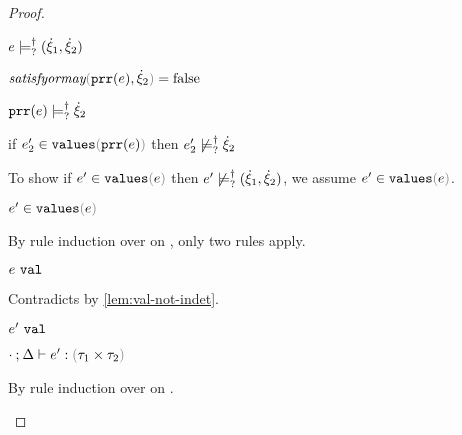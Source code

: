 \begin{proof}
\begin{byCases}
\begin{byCases}
\begin{byCases}
\begin{byCases}
\begin{byCases}
\begin{pfsteps*}
            \item $e \models_{?}^{\dag} (\dot{\xi}_1 , \dot{\xi}_2)$ 
            \end{pfsteps*} 
          \end{byCases} 
          \item[\false]
          \begin{pfsteps*}
          \item $\fsatisfyormay{\hprr{e}}{\hxi_2} = \false$  
          \item $\mathtt{prr}(e) \models_{?}^{\dag} \dot{\xi}_2$  
          \item if $\inValues{e_2'}{\hprr{e}}$ then $e_2' \not\models_{?}^{\dag} \dot{\xi}_2$  
          \end{pfsteps*} 
          To show if $\inValues{e'}{e}$ then $e' \not\models_{?}^{\dag} (\dot{\xi}_1 , \dot{\xi}_2)$, we assume $\inValues{e'}{e}$.
          \begin{pfsteps*}
          \item $\inValues{e'}{e}$  
          \end{pfsteps*}
          By rule induction over  on , only two rules apply.
          \begin{byCases}
            \item[\text{(\ref{rule:IVVal})}]
            \begin{pfsteps*}
            \item $e ~\mathtt{val}$ 
            \end{pfsteps*} 
            Contradicts  by \autoref{lem:val-not-indet}.
            \item[\text{(\ref{rule:IVIndet})}] 
            \begin{pfsteps*}
            \item $e' ~\mathtt{val}$  
            \item $\hexptyp{\cdot}{\Delta}{e'}{\tprod{\tau_1}{\tau_2}}$  
            \end{pfsteps*}
            By rule induction over  on .

\end{byCases}
\end{byCases}
\end{byCases}
\end{byCases}
\end{byCases}
\end{proof}

